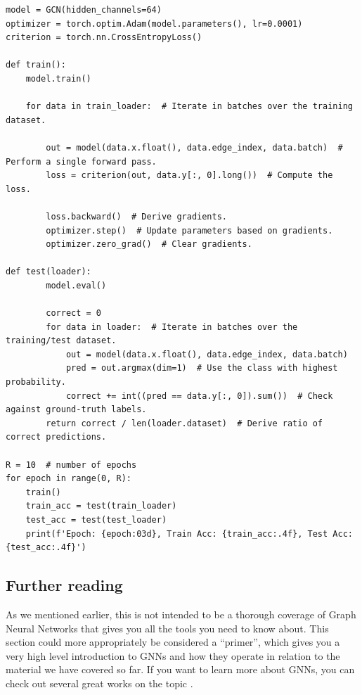 \begin{lstlisting}[style=python]
model = GCN(hidden_channels=64)
optimizer = torch.optim.Adam(model.parameters(), lr=0.0001)
criterion = torch.nn.CrossEntropyLoss()

def train():
    model.train()

    for data in train_loader:  # Iterate in batches over the training dataset.
        
        out = model(data.x.float(), data.edge_index, data.batch)  # Perform a single forward pass.
        loss = criterion(out, data.y[:, 0].long())  # Compute the loss.
        
        loss.backward()  # Derive gradients.
        optimizer.step()  # Update parameters based on gradients.
        optimizer.zero_grad()  # Clear gradients.

def test(loader):
        model.eval()

        correct = 0
        for data in loader:  # Iterate in batches over the training/test dataset.
            out = model(data.x.float(), data.edge_index, data.batch)  
            pred = out.argmax(dim=1)  # Use the class with highest probability.
            correct += int((pred == data.y[:, 0]).sum())  # Check against ground-truth labels.
        return correct / len(loader.dataset)  # Derive ratio of correct predictions.

R = 10  # number of epochs
for epoch in range(0, R):
    train()
    train_acc = test(train_loader)
    test_acc = test(test_loader)
    print(f'Epoch: {epoch:03d}, Train Acc: {train_acc:.4f}, Test Acc: {test_acc:.4f}')
\end{lstlisting}


\subsection*{Further reading}

As we mentioned earlier, this is not intended to be a thorough coverage of Graph Neural Networks that gives you all the tools you need to know about. This section could more appropriately be considered a ``primer'', which gives you a very high level introduction to GNNs and how they operate in relation to the material we have covered so far. If you want to learn more about GNNs, you can check out several great works on the topic \cite{Labonne2023Apr,Bronstein2021Apr}. 

